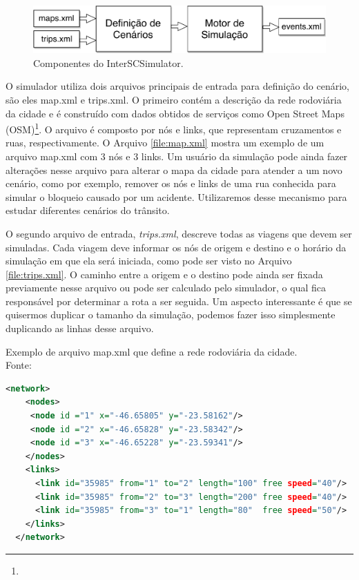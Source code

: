 {\begin{figure}[!htb]
  \centering
  \includegraphics[width=\textwidth]{../figuras/arquitetura-simulador.pdf}
  \caption[Componentes do InterSCSimulator]{Componentes do InterSCSimulator. \label{fig:interscsimulator}}
\end{figure}

  O simulador utiliza dois arquivos principais de entrada para definição do
cenário, são eles map.xml e trips.xml. O primeiro contém a descrição da rede
rodoviária da cidade e é construído com dados obtidos de serviços como Open
Street Maps (OSM)\footnote{}. O arquivo é composto por
nós e links, que representam cruzamentos e ruas, respectivamente. O Arquivo
\ref{file:map.xml} mostra um exemplo de um arquivo map.xml com 3 nós e 3 links. Um
usuário da simulação pode ainda fazer alterações nesse arquivo para alterar o
mapa da cidade para atender a um novo cenário, como por exemplo, remover os nós
e links de uma rua conhecida para simular o bloqueio causado por um acidente.
Utilizaremos desse mecanismo para estudar diferentes cenários do trânsito.

  O segundo arquivo de entrada, \emph{trips.xml}, descreve todas as viagens que
devem ser simuladas. Cada viagem deve informar os nós de origem e destino e o
horário da simulação em que ela será iniciada, como pode ser visto no Arquivo
\ref{file:trips.xml}. O caminho entre a origem e o destino pode ainda ser fixada
previamente nesse arquivo ou pode ser calculado pelo simulador, o qual fica
responsável por determinar a rota a ser seguida. Um aspecto interessante é que
se quisermos duplicar o tamanho da simulação, podemos fazer isso simplesmente
duplicando as linhas desse arquivo.

\begin{programruledcaption}{Exemplo de arquivo map.xml que define a rede rodoviária da cidade. \\Fonte: \citet{mabs2017} \label{file:map.xml}}
  \begin{lstlisting}[language=XML]
  <network>
    <nodes>
     <node id ="1" x="-46.65805" y="-23.58162"/>
     <node id ="2" x="-46.65828" y="-23.58342"/>
     <node id ="3" x="-46.65228" y="-23.59341"/>
    </nodes>
    <links>
      <link id="35985" from="1" to="2" length="100" free speed="40"/>
      <link id="35985" from="2" to="3" length="200" free speed="40"/>
      <link id="35985" from="3" to="1" length="80"  free speed="50"/>
    </links>
  </network>
  \end{lstlisting}
\end{programruledcaption}

}
